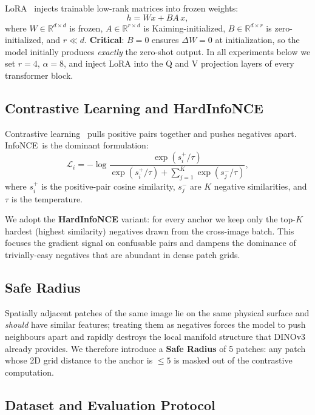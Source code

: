 \documentclass[11pt,a4paper]{article}
\newcommand{\infonce}{InfoNCE\ }
\begin{document}
LoRA~\cite{lora} injects trainable low-rank matrices into frozen weights:
\begin{equation}
h = Wx + BA\,x,
\end{equation}
where $W \in \mathbb{R}^{d \times d}$ is frozen, $A \in \mathbb{R}^{r \times d}$ is Kaiming-initialized,
$B \in \mathbb{R}^{d \times r}$ is zero-initialized, and $r \ll d$.
\textbf{Critical}: $B = 0$ ensures $\Delta W = 0$ at initialization, so the model initially produces
\emph{exactly} the zero-shot output. In all experiments below we set $r = 4$, $\alpha = 8$, and inject
LoRA into the Q and V projection layers of every transformer block.

\subsection{Contrastive Learning and HardInfoNCE}

Contrastive learning~\cite{cpc,simclr} pulls positive pairs together and pushes negatives apart.
\infonce is the dominant formulation:
\begin{equation}
\mathcal{L}_i = -\log\frac{\exp(s_i^+ / \tau)}{\exp(s_i^+ / \tau) + \sum_{j=1}^{K} \exp(s_j^- / \tau)},
\end{equation}
where $s_i^+$ is the positive-pair cosine similarity, $s_j^-$ are $K$ negative similarities, and $\tau$
is the temperature.

We adopt the \textbf{HardInfoNCE} variant: for every anchor we keep only the top-$K$ hardest (highest
similarity) negatives drawn from the cross-image batch. This focuses the gradient signal on confusable
pairs and dampens the dominance of trivially-easy negatives that are abundant in dense patch grids.

\subsection{Safe Radius}

Spatially adjacent patches of the same image lie on the same physical surface and \emph{should} have
similar features; treating them as negatives forces the model to push neighbours apart and rapidly
destroys the local manifold structure that DINOv3 already provides. We therefore introduce a
\textbf{Safe Radius} of 5 patches: any patch whose 2D grid distance to the anchor is $\le 5$ is masked
out of the contrastive computation.

\subsection{Dataset and Evaluation Protocol}
\label{sec:dataset}
\end{document}
